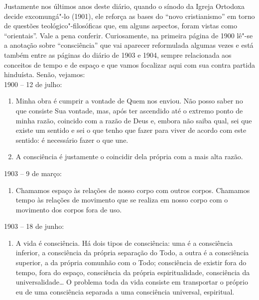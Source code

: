 Justamente nos últimos anos deste diário, quando o sínodo da Igreja Ortodoxa
decide excomungá"-lo (1901), ele reforça as bases do ``novo
cristianismo'' em torno de questões teológico"-filosóficas que, em alguns
aspectos, foram vistas como ``orientais''. Vale a pena conferir. Curiosamente, na primeira página de 1900 lê"-se a anotação sobre
``consciência'' que vai aparecer reformulada algumas vezes e está também
entre as páginas do diário de 1903 e 1904, sempre relacionada aos conceitos de
tempo e de espaço e que vamos focalizar aqui com sua contra partida
hinduísta. Senão, vejamos:\\

1900 -- 12 de julho:

\begin{enumerate}
\def\labelenumi{\arabic{enumi})}
\item
  Minha obra é cumprir a vontade de Quem nos enviou. Não posso saber no
  que consiste Sua vontade, mas, após ter ascendido até o extremo ponto
  de minha razão, coincido com a razão de Deus e, embora não saiba qual,
  sei que existe um sentido e sei o que tenho que fazer para viver de
  acordo com este sentido: é necessário fazer o que une.
\item
  A consciência é justamente o coincidir dela própria com a mais alta
  razão.
\end{enumerate}

1903 -- 9 de março:

\begin{enumerate}
\def\labelenumi{\arabic{enumi})}
\setcounter{enumi}{2}
\item
  Chamamos espaço às relações de nosso corpo com outros corpos. Chamamos
  tempo às relações de movimento que se realiza em nosso corpo com o
  movimento dos corpos fora de uso.
\end{enumerate}

1903 -- 18 de junho:

\begin{enumerate}
\def\labelenumi{\arabic{enumi})}
\setcounter{enumi}{3}
\item
  A vida é consciência. Há dois tipos de consciência: uma é a
  consciência inferior, a consciência da própria separação do Todo, a
  outra é a consciência superior, a da própria comunhão com o Todo;
  consciência de existir fora do tempo, fora do espaço, consciência da
  própria espiritualidade, consciência da universalidade\ldots{} O problema
  toda da vida consiste em transportar o próprio eu de uma consciência
  separada a uma consciência universal, espiritual.
\end{enumerate}

